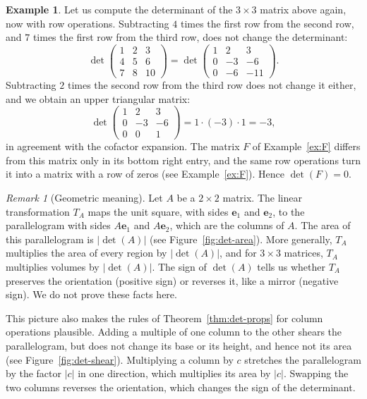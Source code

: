\documentclass[11pt]{article}
\theoremstyle{definition}
\newtheorem{example}[definition]{Example}
\theoremstyle{plain}
\theoremstyle{remark}
\newtheorem{remark}[definition]{Remark}
\begin{document}
\begin{example}
    Let us compute the determinant of the $3 \times 3$ matrix above again, now with row operations. Subtracting $4$ times the first row from the second row, and $7$ times the first row from the third row, does not change the determinant:
    \[\det \begin{pmatrix}
        1 & 2 & 3 \\
        4 & 5 & 6 \\
        7 & 8 & 10
    \end{pmatrix} = \det \begin{pmatrix}
        1 & 2 & 3 \\
        0 & -3 & -6 \\
        0 & -6 & -11
    \end{pmatrix}.\]
    Subtracting $2$ times the second row from the third row does not change it either, and we obtain an upper triangular matrix:
    \[\det \begin{pmatrix}
        1 & 2 & 3 \\
        0 & -3 & -6 \\
        0 & 0 & 1
    \end{pmatrix} = 1 \cdot (-3) \cdot 1 = -3,\]
    in agreement with the cofactor expansion. The matrix $F$ of Example~\ref{ex:F} differs from this matrix only in its bottom right entry, and the same row operations turn it into a matrix with a row of zeros (see Example~\ref{ex:F}). Hence $\det(F) = 0$.
\end{example}

\begin{remark}[Geometric meaning]
    Let $A$ be a $2 \times 2$ matrix. The linear transformation $T_A$ maps the unit square, with sides $\mathbf{e}_1$ and $\mathbf{e}_2$, to the parallelogram with sides $A\mathbf{e}_1$ and $A\mathbf{e}_2$, which are the columns of $A$. The area of this parallelogram is $|\det(A)|$ (see Figure~\ref{fig:det-area}). More generally, $T_A$ multiplies the area of every region by $|\det(A)|$, and for $3 \times 3$ matrices, $T_A$ multiplies volumes by $|\det(A)|$. The sign of $\det(A)$ tells us whether $T_A$ preserves the orientation (positive sign) or reverses it, like a mirror (negative sign). We do not prove these facts here.

    This picture also makes the rules of Theorem~\ref{thm:det-props} for column operations plausible. Adding a multiple of one column to the other shears the parallelogram, but does not change its base or its height, and hence not its area (see Figure~\ref{fig:det-shear}). Multiplying a column by $c$ stretches the parallelogram by the factor $|c|$ in one direction, which multiplies its area by $|c|$. Swapping the two columns reverses the orientation, which changes the sign of the determinant.
\end{remark}
\end{document}
